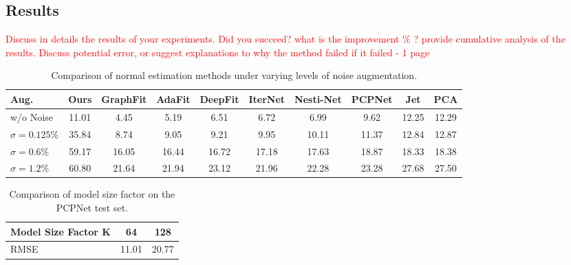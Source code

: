 \documentclass{acmart}
\newcommand{\instructions}[1]{\textcolor{red}{#1}\newline}
\begin{document}
 \subsection{Results}
 \instructions{Discuss in details the results of your experiments. Did you succeed? what is the improvement \% ? provide cumulative analysis of the results. Discuss potential error, or suggest explanations to why the method failed if it failed - 
 1 page}

 \begin{table}[ht]
  \centering
  \caption{Comparison of normal estimation methods under varying levels of noise augmentation.}
  \label{tab:noise_comparison}
  \begin{tabular}{lccccccccc}
  \hline
  \textbf{Aug.} & \textbf{Ours} & \textbf{GraphFit} & \textbf{AdaFit} & \textbf{DeepFit} & \textbf{IterNet} & \textbf{Nesti-Net} & \textbf{PCPNet} & \textbf{Jet} & \textbf{PCA} \\ \hline
  w/o Noise & 11.01 & 4.45  & 5.19  & 6.51  & 6.72  & 6.99  & 9.62  & 12.25 & 12.29 \\
  $\sigma = 0.125\%$ & 35.84 & 8.74  & 9.05  & 9.21  & 9.95  & 10.11 & 11.37 & 12.84 & 12.87 \\
  $\sigma = 0.6\%$  & 59.17 & 16.05 & 16.44 & 16.72 & 17.18 & 17.63 & 18.87 & 18.33 & 18.38 \\
  $\sigma = 1.2\%$  & 60.80 & 21.64 & 21.94 & 23.12 & 21.96 & 22.28 & 23.28 & 27.68 & 27.50 \\ \hline
  \end{tabular}
  \end{table}

\begin{table}[ht]
  \centering
  \caption{Comparison of model size factor on the PCPNet test set.}
  \label{tab:size_comparison}
  \begin{tabular}{lcc}
  \hline
  \textbf{Model Size Factor K} & \textbf{64} & \textbf{128} \\ \hline
  RMSE & 11.01 & 20.77 \\ \hline
  \end{tabular}
  \end{table}
\end{document}
